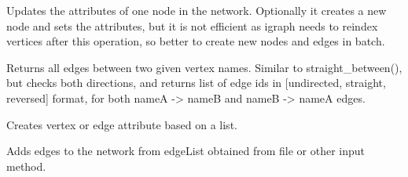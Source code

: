 \documentclass[letterpaper,10pt,english]{sphinxmanual}
\begin{document}
\begin{fulllineitems}

\begin{fulllineitems}
\label{\detokenize{main:pypath.main.PyPath.add_update_vertex}}
Updates the attributes of one node in the network.
Optionally it creates a new node and sets the attributes,
but it is not efficient as igraph needs to reindex vertices
after this operation, so better to create new nodes and
edges in batch.

\end{fulllineitems}


\begin{fulllineitems}
\label{\detokenize{main:pypath.main.PyPath.all_between}}
Returns all edges between two given vertex names. Similar to
straight\_between(), but checks both directions, and returns
list of edge ids in {[}undirected, straight, reversed{]} format,
for both nameA -\textgreater{} nameB and nameB -\textgreater{} nameA edges.

\end{fulllineitems}


\begin{fulllineitems}
\label{\detokenize{main:pypath.main.PyPath.apply_list}}
Creates vertex or edge attribute based on a list.

\end{fulllineitems}


\begin{fulllineitems}
\label{\detokenize{main:pypath.main.PyPath.attach_network}}
Adds edges to the network from edgeList obtained from file or
other input method.

\end{fulllineitems}


\end{fulllineitems}
\end{document}

